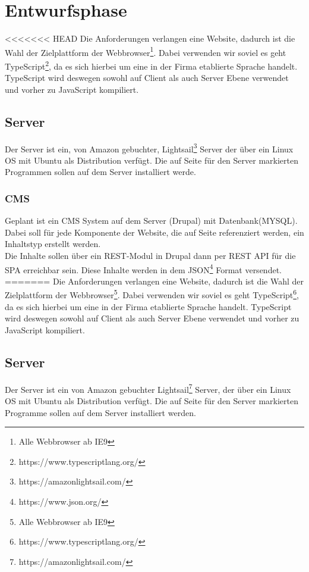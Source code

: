 \documentclass[11pt,a4paper]{article}
\begin{document}
\section{Entwurfsphase}
<<<<<<< HEAD
Die Anforderungen verlangen eine Website, dadurch ist die Wahl der Zielplattform der Webbrowser\footnote{Alle Webbrowser ab IE9}. Dabei verwenden wir soviel es geht TypeScript\footnote{https://www.typescriptlang.org/}, da es sich hierbei um eine in der Firma etablierte Sprache handelt. TypeScript wird deswegen sowohl auf Client als auch Server Ebene verwendet und vorher zu JavaScript kompiliert.
\subsection{Server}
Der Server ist ein, von Amazon gebuchter, Lightsail\footnote{https://amazonlightsail.com/} Server der über ein Linux OS mit Ubuntu als Distribution verfügt. Die auf Seite \pageref{sec:progs} für den Server markierten Programmen sollen auf dem Server installiert werde.
\subsubsection{CMS}
Geplant ist ein CMS System auf dem Server (Drupal) mit Datenbank(MYSQL). Dabei soll für jede Komponente der Website, die auf Seite \pageref{sec:epage}
referenziert werden, ein Inhaltstyp erstellt werden.\\
Die Inhalte sollen über ein REST-Modul in Drupal dann per REST \acs{API} für die SPA erreichbar sein.
Diese Inhalte  werden in dem JSON\footnote{https://www.json.org/} Format versendet.
=======
Die Anforderungen verlangen eine Website, dadurch ist die Wahl der Zielplattform der Webbrowser\footnote{Alle Webbrowser ab IE9}. Dabei verwenden wir soviel es geht TypeScript\footnote{https://www.typescriptlang.org/}, da es sich hierbei um eine in der Firma etablierte Sprache handelt. TypeScript wird deswegen sowohl auf Client als auch Server Ebene verwendet und vorher zu JavaScript kompiliert. 
\subsection{Server}
Der Server ist ein von Amazon gebuchter Lightsail\footnote{https://amazonlightsail.com/} Server, der über ein Linux OS mit Ubuntu als Distribution verfügt. Die auf Seite \pageref{sec:progs} für den Server markierten Programme sollen auf dem Server installiert werden.
\end{document}
